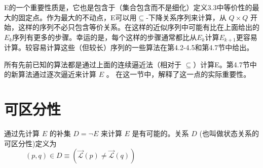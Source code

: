 

\begin{remark}
    E的一个重要性质是，它也是包含于（集合包含而不是细化）定义3.3中等价性的最大的固定点。作为最大的不动点，E可以用$\subseteq$-下降关系序列来计算，从 $Q\times Q$ 开始，这样的序列不必只包含等价关系。在这样的近似序列中可能有比在上面给出的$E_k$序列有更多的步骤。幸运的是，每个这样的步骤通常都比从$E_k$计算$E_{k+1}$更容易计算。较容易计算这些（但较长）序列的一些算法在第4.2-4.5和第4.7节中给出。
\end{remark}


所有先前已知的算法都是通过上面的连续逼近法（相对于 $\subseteq$）计算E。第4.7节中的新算法通过逐次逼近来计算 $E$ 。%
在这一节中，解释了这一点的实际重要性。



\section{可区分性}
通过先计算 $E$ 的补集 $D=\neg E$ 来计算 $E$ 是有可能的。关系 $D$ (也叫做状态关系的可区分性)定义为 \\
\mbox{　　　}$ (p,q) \in D \equiv (\overrightarrow{\mathcal{L}}(p) \not=\overrightarrow{\mathcal{L}}(q)) $\\

